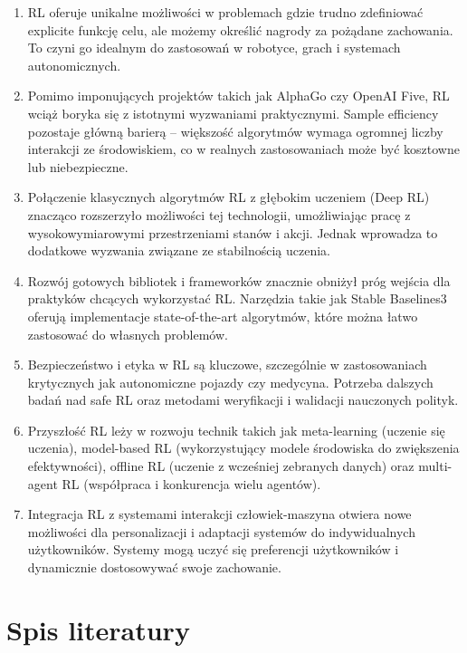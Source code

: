 \documentclass[12pt,a4paper]{article}
\begin{document}
\begin{enumerate}
\item RL oferuje unikalne możliwości w problemach gdzie trudno zdefiniować explicite funkcję celu, ale możemy określić nagrody za pożądane zachowania. To czyni go idealnym do zastosowań w robotyce, grach i systemach autonomicznych.

\item Pomimo imponujących projektów takich jak AlphaGo czy OpenAI Five, RL wciąż boryka się z istotnymi wyzwaniami praktycznymi. Sample efficiency pozostaje główną barierą -- większość algorytmów wymaga ogromnej liczby interakcji ze środowiskiem, co w realnych zastosowaniach może być kosztowne lub niebezpieczne.

\item Połączenie klasycznych algorytmów RL z głębokim uczeniem (Deep RL) znacząco rozszerzyło możliwości tej technologii, umożliwiając pracę z wysokowymiarowymi przestrzeniami stanów i akcji. Jednak wprowadza to dodatkowe wyzwania związane ze stabilnością uczenia.

\item Rozwój gotowych bibliotek i frameworków znacznie obniżył próg wejścia dla praktyków chcących wykorzystać RL. Narzędzia takie jak Stable Baselines3 oferują implementacje state-of-the-art algorytmów, które można łatwo zastosować do własnych problemów.

\item Bezpieczeństwo i etyka w RL są kluczowe, szczególnie w zastosowaniach krytycznych jak autonomiczne pojazdy czy medycyna. Potrzeba dalszych badań nad safe RL oraz metodami weryfikacji i walidacji nauczonych polityk.

\item Przyszłość RL leży w rozwoju technik takich jak meta-learning (uczenie się uczenia), model-based RL (wykorzystujący modele środowiska do zwiększenia efektywności), offline RL (uczenie z wcześniej zebranych danych) oraz multi-agent RL (współpraca i konkurencja wielu agentów).

\item Integracja RL z systemami interakcji człowiek-maszyna otwiera nowe możliwości dla personalizacji i adaptacji systemów do indywidualnych użytkowników. Systemy mogą uczyć się preferencji użytkowników i dynamicznie dostosowywać swoje zachowanie.
\end{enumerate}

\newpage

\section{Spis literatury}
\end{document}
